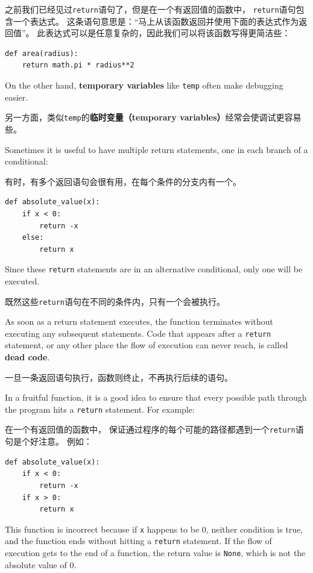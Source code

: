 \documentclass[10pt]{book}
\begin{document}
\begin{CJK}{UTF8}{gbsn}
之前我们已经见过{\tt return}语句了，但是在一个有返回值的函数中，
{\tt return}语句包含一个表达式。
这条语句意思是：``马上从该函数返回并使用下面的表达式作为返回值''。
此表达式可以是任意复杂的，因此我们可以将该函数写得更简洁些：

\begin{verbatim}
def area(radius):
    return math.pi * radius**2
\end{verbatim}
%
On the other hand, {\bf temporary variables} like {\tt temp} often make
debugging easier.

另一方面，类似{\tt temp}的{\bf 临时变量（temporary variables）}经常会使调试更容易些。

Sometimes it is useful to have multiple return statements, one in each
branch of a conditional:

有时，有多个返回语句会很有用，在每个条件的分支内有一个。

\begin{verbatim}
def absolute_value(x):
    if x < 0:
        return -x
    else:
        return x
\end{verbatim}
%
Since these {\tt return} statements are in an alternative conditional,
only one will be executed.

既然这些{\tt return}语句在不同的条件内，只有一个会被执行。

As soon as a return statement executes, the function
terminates without executing any subsequent statements.
Code that appears after a {\tt return} statement, or any other place
the flow of execution can never reach, is called {\bf dead code}.

一旦一条返回语句执行，函数则终止，不再执行后续的语句。

In a fruitful function, it is a good idea to ensure
that every possible path through the program hits a
{\tt return} statement.  For example:

在一个有返回值的函数中，
保证通过程序的每个可能的路径都遇到一个{\tt return}语句是个好注意。
例如：

\begin{verbatim}
def absolute_value(x):
    if x < 0:
        return -x
    if x > 0:
        return x
\end{verbatim}
%
This function is incorrect because if {\tt x} happens to be 0,
neither condition is true, and the function ends without hitting a
{\tt return} statement.  If the flow of execution gets to the end
of a function, the return value is {\tt None}, which is not
the absolute value of 0.


\end{CJK}
\end{document}
